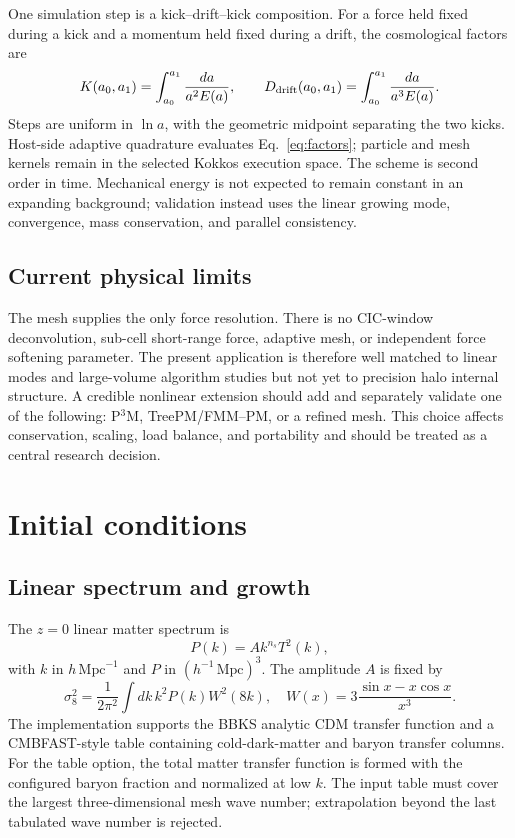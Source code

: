 \documentclass[11pt]{article}
\begin{document}
One simulation step is a kick--drift--kick composition.  For a force held fixed
during a kick and a momentum held fixed during a drift, the cosmological factors
are
\begin{equation}
  K(a_0,a_1)=\int_{a_0}^{a_1}\frac{da}{a^2E(a)},
  \qquad
  D_{\rm drift}(a_0,a_1)=\int_{a_0}^{a_1}\frac{da}{a^3E(a)}.
  \label{eq:factors}
\end{equation}
Steps are uniform in $\ln a$, with the geometric midpoint separating the two
kicks.  Host-side adaptive quadrature evaluates Eq.~\eqref{eq:factors}; particle
and mesh kernels remain in the selected Kokkos execution space.  The scheme is
second order in time.  Mechanical energy is not expected to remain constant in
an expanding background; validation instead uses the linear growing mode,
convergence, mass conservation, and parallel consistency.

\subsection{Current physical limits}

The mesh supplies the only force resolution.  There is no CIC-window
deconvolution, sub-cell short-range force, adaptive mesh, or independent force
softening parameter.  The present application is therefore well matched to
linear modes and large-volume algorithm studies but not yet to precision halo
internal structure.  A credible nonlinear extension should add and separately
validate one of the following: P$^3$M, TreePM/FMM--PM, or a refined mesh.  This
choice affects conservation, scaling, load balance, and portability and should
be treated as a central research decision.

\section{Initial conditions}
\label{sec:ics}

\subsection{Linear spectrum and growth}

The $z=0$ linear matter spectrum is
\begin{equation}
  P(k)=A k^{n_s}T^2(k),
  \label{eq:pk}
\end{equation}
with $k$ in $h\,\mathrm{Mpc}^{-1}$ and $P$ in
$(h^{-1}\,\mathrm{Mpc})^3$.  The amplitude $A$ is fixed by
\begin{equation}
  \sigma_8^2=\frac{1}{2\pi^2}
  \int dk\,k^2P(k)W^2(8k),
  \quad
  W(x)=3\frac{\sin x-x\cos x}{x^3}.
  \label{eq:sigma8}
\end{equation}
The implementation supports the BBKS analytic CDM transfer function and a
CMBFAST-style table containing cold-dark-matter and baryon transfer columns.
For the table option, the total matter transfer function is formed with the
configured baryon fraction and normalized at low $k$.  The input table must
cover the largest three-dimensional mesh wave number; extrapolation beyond the
last tabulated wave number is rejected.
\end{document}
